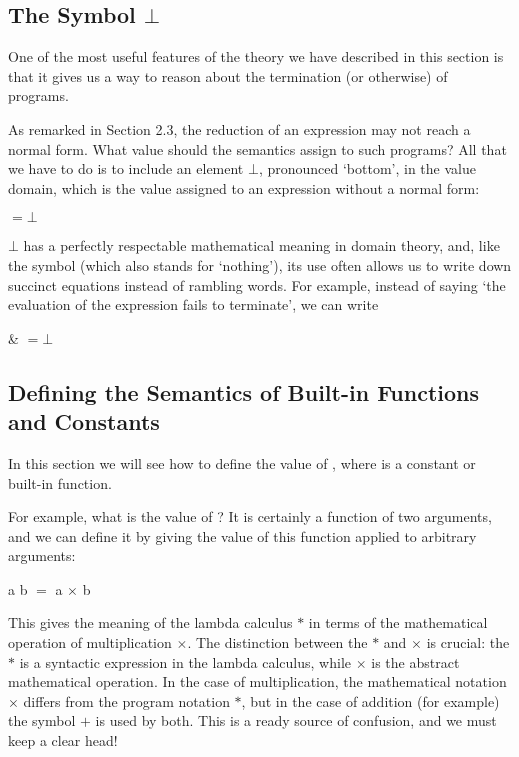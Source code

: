 \subsection{The Symbol $\bot$}

One of the most useful features of the theory we have described in this section
is that it gives us a way to reason about the termination (or otherwise) of
programs.

As remarked in Section 2.3, the reduction of an expression may not reach a
normal form. What value should the semantics assign to such programs? All
that we have to do is to include an element $\bot$, pronounced `bottom', in the
value domain, which is the value assigned to an expression without a normal
form:

\begin{mlcoded}
     $= \bot$
\end{mlcoded}

\noindent$\bot$ has a perfectly respectable mathematical meaning in domain theory, and,
like the symbol  (which also stands for `nothing'), its use often allows us to
write down succinct equations instead of rambling words. For example,
instead of saying `the evaluation of the expression  fails to terminate', we can
write

\begin{mlalign}
     & $= \bot$
\end{mlalign}

\subsection{Defining the Semantics of Built-in Functions and Constants}

In this section we will see how to define the value of , where  is a
constant or built-in function.

For example, what is the value of \evalbb{$*$}? It is certainly a function of two arguments, and we can define it by giving the value of this function
applied to arbitrary arguments:
\begin{mlcoded}
    \evalbb{$*$} a b $=$ a $\times$ b
\end{mlcoded}
This gives the meaning of the lambda calculus $*$ in terms of the mathematical
operation of multiplication $\times$. The distinction between the $*$ and $\times$ is crucial:
the $*$ is a syntactic expression in the lambda calculus, while $\times$ is the abstract
mathematical operation. In the case of multiplication, the mathematical
notation $\times$ differs from the program notation $*$, but in the case of addition (for
example) the symbol $+$ is used by both. This is a ready source of confusion,
and we must keep a clear head!

